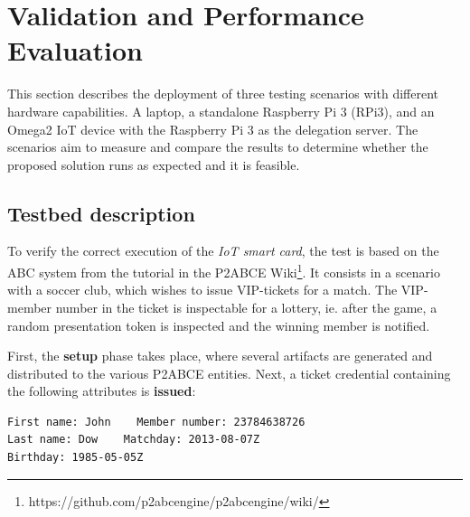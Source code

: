 \section{Validation and Performance Evaluation}\label{ch:validation}


This section describes the deployment of three testing scenarios with different hardware capabilities. A laptop, a standalone Raspberry Pi 3 (RPi3), and an Omega2 IoT device with the Raspberry Pi 3 as the delegation server. The scenarios aim to measure and compare the results to determine whether the proposed solution runs as expected and it is feasible.

\subsection{Testbed description}



To verify the correct execution of the \textit{IoT smart card}, the test is based on the ABC system from the tutorial in the P2ABCE Wiki\footnote{{https://github.com/p2abcengine/p2abcengine/wiki/}}.  It consists in a scenario with a soccer club, which wishes to issue VIP-tickets for a match. The VIP-member number in the ticket is inspectable for a lottery, ie. after the game, a random presentation token is inspected and the winning member is notified.

First, the \textbf{setup} phase takes place, where several artifacts are generated and distributed to the various P2ABCE entities. Next, a ticket credential containing the following attributes is \textbf{issued}:
\begin{Verbatim}[fontsize=\footnotesize]
First name: John	Member number: 23784638726	
Last name: Dow	  Matchday: 2013-08-07Z
Birthday: 1985-05-05Z
\end{Verbatim}


